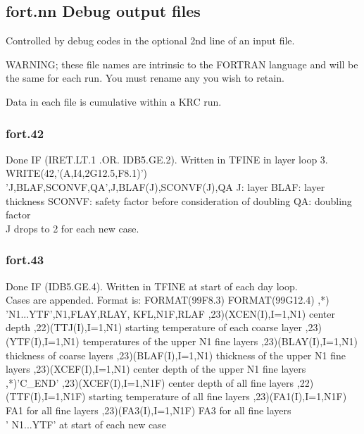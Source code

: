 \documentclass{article}
\begin{document}
\subsection{fort.nn  Debug output files}

Controlled by debug codes in the optional 2nd line of an input file.

WARNING; these file names are intrinsic to the FORTRAN language and will be the
same for each run. You must rename any you wish to retain.

Data in each file is cumulative within a KRC run.

\subsubsection{fort.42}
Done IF (IRET.LT.1 .OR. IDB5.GE.2). Written in TFINE in layer loop 3.
\\  WRITE(42,'(A,I4,2G12.5,F8.1)') 'J,BLAF,SCONVF,QA',J,BLAF(J),SCONVF(J),QA 
\qi J: layer
\qi BLAF: layer thickness
\qi SCONVF: safety factor before consideration of doubling
\qi QA: doubling factor
\\ J drops to 2 for each new case.

\subsubsection{fort.43}
 Done IF (IDB5.GE.4). Written in TFINE at start of each day loop.  
\\ Cases are appended. Format is:
   FORMAT(99F8.3)
   FORMAT(99G12.4)
\qi  ,*)  'N1...YTF',N1,FLAY,RLAY, KFL,N1F,RLAF
\qi  ,23)(XCEN(I),I=1,N1) center depth
\qi  ,22)(TTJ(I),I=1,N1)  starting temperature of each coarse layer
\qi  ,23)(YTF(I),I=1,N1)  temperatures of the upper N1 fine layers
\qi  ,23)(BLAY(I),I=1,N1) thickness of coarse layers
\qi  ,23)(BLAF(I),I=1,N1) thickness of the upper N1 fine layers
\qi  ,23)(XCEF(I),I=1,N1) center depth of the upper N1 fine layers
\qi  ,*)'C_END'
\qi  ,23)(XCEF(I),I=1,N1F) center depth of all fine layers
\qi  ,22)(TTF(I),I=1,N1F) starting temperature of all fine layers
\qi  ,23)(FA1(I),I=1,N1F) FA1  for all fine layers
\qi  ,23)(FA3(I),I=1,N1F) FA3  for all fine layers
\\ ' N1...YTF' at start of each new case
\end{document}

